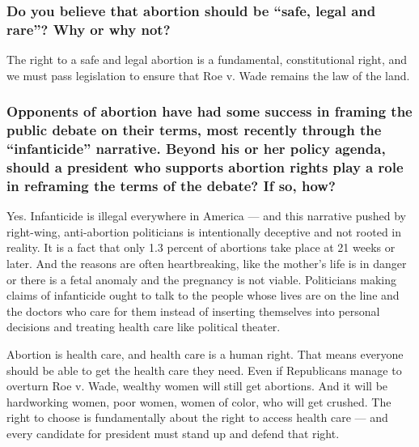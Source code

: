\hypertarget{do-you-believe-that-abortion-should-be-safe-legal-and-rare-why-or-why-not-7}{%
\subsubsection{Do you believe that abortion should be ``safe, legal and
rare''? Why or why
not?}\label{do-you-believe-that-abortion-should-be-safe-legal-and-rare-why-or-why-not-7}}

The right to a safe and legal abortion is a fundamental, constitutional
right, and we must pass legislation to ensure that Roe v. Wade remains
the law of the land.

\hypertarget{opponents-of-abortion-have-had-some-success-in-framing-the-public-debate-on-their-terms-most-recently-through-the-infanticide-narrative-beyond-his-or-her-policy-agenda-should-a-president-who-supports-abortion-rights-play-a-role-in-reframing-the-terms-of-the-debate-if-so-how-7}{%
\subsubsection{Opponents of abortion have had some success in framing
the public debate on their terms, most recently through the
``infanticide'' narrative. Beyond his or her policy agenda, should a
president who supports abortion rights play a role in reframing the
terms of the debate? If so,
how?}\label{opponents-of-abortion-have-had-some-success-in-framing-the-public-debate-on-their-terms-most-recently-through-the-infanticide-narrative-beyond-his-or-her-policy-agenda-should-a-president-who-supports-abortion-rights-play-a-role-in-reframing-the-terms-of-the-debate-if-so-how-7}}

Yes. Infanticide is illegal everywhere in America --- and this narrative
pushed by right-wing, anti-abortion politicians is intentionally
deceptive and not rooted in reality. It is a fact that only 1.3 percent
of abortions take place at 21 weeks or later. And the reasons are often
heartbreaking, like the mother's life is in danger or there is a fetal
anomaly and the pregnancy is not viable. Politicians making claims of
infanticide ought to talk to the people whose lives are on the line and
the doctors who care for them instead of inserting themselves into
personal decisions and treating health care like political theater.

Abortion is health care, and health care is a human right. That means
everyone should be able to get the health care they need. Even if
Republicans manage to overturn Roe v. Wade, wealthy women will still get
abortions. And it will be hardworking women, poor women, women of color,
who will get crushed. The right to choose is fundamentally about the
right to access health care --- and every candidate for president must
stand up and defend that right.

